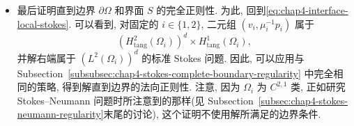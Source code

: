 \begin{Proof}
\begin{itemize}
由于 $\theta$ 与 $S$ 相切, 流 $\tau^\theta$ 把每个子域 $\Omega_i$ 映到自身. 因此, 由假设 $\mu$ 在每个子域上 Lipschitz 连续, 有
\[
 \|\delta_h^\theta\mu\|_{L^\infty}
 \leq C|h|\bigl(\|\mu\|_{W^{1,\infty}(\Omega_1)}
 +\|\mu\|_{W^{1,\infty}(\Omega_2)}\bigr).
\]
此外, 可以使用 Lemma~\ref{lem:chap4-boundary-tangential-difference}处理边界项 $T_2''$ 和 $T_3''$. 最终得到估计
\begin{align*}
 |T_1''(\varphi)|
 &\leq C|h|\bigl(\|\mu\|_{W^{1,\infty}(\Omega_1)}
 +\|\mu\|_{W^{1,\infty}(\Omega_2)}\bigr)\|v\|_{H^1}\|\varphi\|_{H^1},\\
 |T_2''(\varphi)|
 &\leq\|\delta_h^\theta j_S\|_{H^{-1/2}(S)}\|\gamma_0(\varphi)\|_{H^{1/2}(S)}
 \leq C|h|\|j_S\|_{H^{1/2}(S)}\|\varphi\|_{H^1},\\
 |T_3''(\varphi)|
 &\leq C|h|\|j_S\|_{L^2(S)}\|\gamma_0(\varphi)\|_{L^2(S)}
 \leq C|h|\|j_S\|_{H^{1/2}(S)}\|\varphi\|_{H^1}.
\end{align*}
汇集所有这些不等式, 得到
\begin{align*}
 \left|\int_\Omega(\delta_h^\theta p)\operatorname{div}\varphi\,\mathrm dx\right|
 &\leq\|\nabla\delta_h^\theta v\|_{L^2}\|\nabla\varphi\|_{L^2}\\
 &\quad+C|h|\bigl(\|\nabla v\|_{L^2}+\|p\|_{L^2}
 +\|f_0\|_{L^2}+\|j_S\|_{H^{1/2}}\bigr)\|\varphi\|_{H_0^1},\\
 &\qquad\forall\varphi\in(H_0^1(\Omega))^d.
\end{align*}
由 Nečas 不等式 Theorem~\ref{thm:chap4-necas-inequality}, 可以推出
\begin{equation}
 \|\delta_h^\theta p\|_{L^2}
 \leq C\|\nabla\delta_h^\theta v\|_{L^2}
 +C|h|\bigl(\|\nabla v\|_{L^2}+\|p\|_{L^2}
 +\|f\|_{L^2}+\|j_S\|_{H^{1/2}}\bigr).
 \label{eq:chap4-interface-tangential-pressure}
\end{equation}
回到\eqref{eq:chap4-interface-tangential-identity}, 取 $\varphi=\delta_h^\theta v$, 使用 $\inf_\Omega\mu>0$ 以及 Korn 不等式, 最终得到
\[
 \|\nabla\delta_h^\theta v\|_{L^2}^2
 \leq C|h|^2\bigl(\|g\|_{H^1}+\|v\|_{H^1}+\|p\|_{L^2}
 +\|f\|_{L^2}+\|j_S\|_{H^{1/2}}\bigr)^2,
\]
而 $\delta_h^\theta p$ 的估计由\eqref{eq:chap4-interface-tangential-pressure}得到. 这就证明了 $v$ 和 $p$ 在每个子域 $\Omega_1$ 和 $\Omega_2$ 中的切向正则性.

\item 最后证明直到边界 $\partial\Omega$ 和界面 $S$ 的完全正则性. 为此, 回到\eqref{eq:chap4-interface-local-stokes}. 可以看到, 对固定的 $i\in\{1,2\}$, 二元组 $(v_i,\mu_i^{-1}p_i)$ 属于
\[
 (H_{\mathrm{tang}}^2(\Omega_i))^d\times H_{\mathrm{tang}}^1(\Omega_i),
\]
并解右端属于 $(L^2(\Omega_i))^d$ 的标准 Stokes 问题. 因此, 可以应用与 Subsection~\ref{subsubsec:chap4-stokes-complete-boundary-regularity} 中完全相同的策略, 得到解直到边界的法向正则性. 注意, 因为 $\Omega_i$ 为 $C^{2,1}$ 类, 正如研究 Stokes--Neumann 问题时所注意到的那样(见 Subsection~\ref{subsec:chap4-stokes-neumann-regularity}末尾的讨论), 这个证明不使用解所满足的边界条件.
\end{itemize}
\end{Proof}
